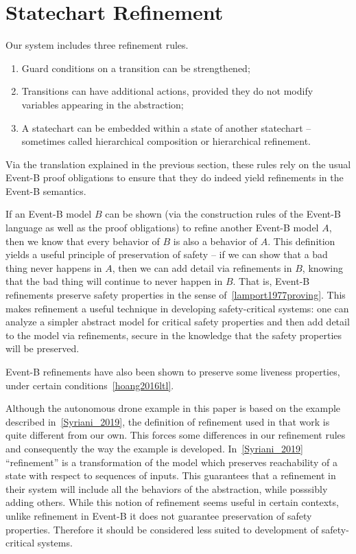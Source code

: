 
\section{Statechart Refinement}

Our system includes three refinement rules.

\begin{enumerate}
\item Guard conditions on a transition can be strengthened;
\item Transitions can have additional actions, provided they do not
  modify variables appearing in the abstraction;
\item A statechart can be embedded within a state of another
  statechart -- sometimes called hierarchical composition or
  hierarchical refinement.
\end{enumerate}

Via the translation explained in the previous section, these rules
rely on the usual Event-B proof obligations to ensure that they do
indeed yield refinements in the Event-B semantics.

If an Event-B model $B$ can be shown (via the construction rules of
the Event-B language as well as the proof obligations) to refine
another Event-B model $A$, then we know that every behavior of $B$ is
also a behavior of $A$. This definition yields a useful principle of
preservation of safety -- if we can show that a bad thing never
happens in $A$, then we can add detail via refinements in $B$, knowing
that the bad thing will continue to never happen in $B$. That is,
Event-B refinements preserve safety properties in the sense
of~\ref{lamport1977proving}. This makes refinement a useful technique
in developing safety-critical systems: one can analyze a simpler
abstract model for critical safety properties and then add detail to
the model via refinements, secure in the knowledge that the safety
properties will be preserved.

Event-B refinements have also been shown to preserve some liveness
properties, under certain conditions~\ref{hoang2016ltl}.

Although the autonomous drone example in this paper is based on the
example described in~\ref{Syriani_2019}, the definition of refinement
used in that work is quite different from our own. This forces some
differences in our refinement rules and consequently the way the
example is developed. In~\ref{Syriani_2019} ``refinement'' is a
transformation of the model which preserves reachability of a state
with respect to sequences of inputs. This guarantees that a refinement
in their system will include all the behaviors of the abstraction,
while posssibly adding others. While this notion of refinement seems
useful in certain contexts, unlike refinement in Event-B it does not
guarantee preservation of safety properties. Therefore it should be
considered less suited to development of safety-critical systems.
